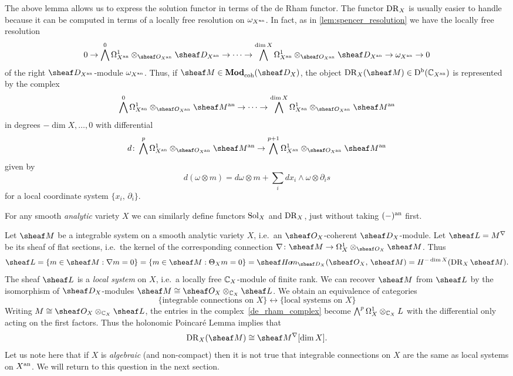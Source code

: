 \documentclass[number-in-sections,a4paper]{notes}
\begin{document}
The above lemma allows us to express the solution functor in terms of the de Rham functor.
The functor $\operatorname{DR}_X$ is usually easier to handle because it can be computed in terms of a locally free resolution on $\omega_{X^{\mathrm{an}}}$.
In fact, as in \ref{lem:spencer_resolution} we have the locally free resolution
\[
    0 \to
    \bigwedge^0 \ctb {X^\an} \otimes_{\sO_{X^\an}} \sD_{X^\an} \to
    \dots \to
    \bigwedge^{\dim X} \ctb {X^\an} \otimes_{\sO_{X^\an}} \sD_{X^\an} \to
    \canon_{X^\an} \to 0
\]
of the right $\sD_{X^\an}$-module $\omega_{X^{\mathrm{an}}}$.
Thus, if $\sheaf M \in \catDModcoh{X}$, the object $\DR_X(\sheaf M) \in \catDbCMod{X^\an}$ is represented by the complex
\begin{equation}\label{de_rham_complex}
    \bigwedge^0 \ctb {X^\an} \otimes_{\sO_{X^\an}} \sheaf M^\an \to
    \dots \to
    \bigwedge^{\dim X} \ctb {X^\an} \otimes_{\sO_{X^\an}} \sheaf M^\an
\end{equation}
in degrees $-\dim X, \dots, 0$ with differential
\[
    d\colon \bigwedge^p \ctb {X^\an} \otimes_{\sO_{X^\an}} \sheaf M^\an \to \bigwedge^{p+1} \ctb {X^\an} \otimes_{\sO_{X^\an}} \sheaf M^\an
\]
given by
\[
    d(\omega \otimes m) = d\omega \otimes m + \sum_i dx_i \wedge \omega \otimes \partial_i s
\]
for a local coordinate system $\{x_i,\, \partial_i\}$.

\begin{Example}
    For any smooth \emph{analytic} variety $X$ we can similarly define functors $\operatorname{Sol}_X$ and $\operatorname{DR}_X$, just without taking $(-)^{\mathrm{an}}$ first.

    Let $\sheaf M$ be a integrable system on a smooth analytic variety $X$, i.e.~an $\sO_{X}$-coherent $\sD_{X}$-module.
    Let $\sheaf L = M^\nabla$ be its sheaf of flat sections, i.e.~the kernel of the corresponding connection $\nabla\colon \sheaf M \to \ctb X \otimes_{\sO_X} \sheaf M$.
    Thus
    \[
        \sheaf L = \{ m \in \sheaf M : \nabla m = 0\} =
        \{ m \in \sheaf M : \tb Xm = 0 \} =
        \sheafHom_{\sD_X}(\sO_X,\, \sheaf M) =
        H^{-\dim X}(\DR_X\sheaf M).
    \]
    The sheaf $\sheaf L$ is a \emph{local system} on $X$, i.e.~a locally free ${\mathbb{C}}_X$-module of finite rank.
    We can recover $\sheaf M$ from $\sheaf L$ by the isomorphism of $\sD_X$-modules $\sheaf M \cong \sO_X \otimes_{\CC_X} \sheaf L$.
    We obtain an equivalence of categories
    \[
        \bigl\{\text{integrable connections on $X$}\bigr \}
        \leftrightarrow
        \bigl\{\text{local systems on $X$}\bigr \}
    \]
    Writing $M \cong \sO_X \otimes_{\CC_X} \sheaf L$, the entries in the complex~\eqref{de_rham_complex} become $\bigwedge^p \Omega^1_{X} \otimes_{{\mathbb{C}}_X} L$ with the differential only acting on the first factors.
    Thus the holonomic Poincar\'e Lemma implies that
    \[
        \DR_X(\sheaf M) \cong \sheaf M^\nabla[\dim X].
    \]
    Let us note here that if $X$ is \emph{algebraic} (and non-compact) then it is not true that integrable connections on $X$ are the same as local systems on $X^{\mathrm{an}}$.
    We will return to this question in the next section.
\end{Example}
\end{document}
